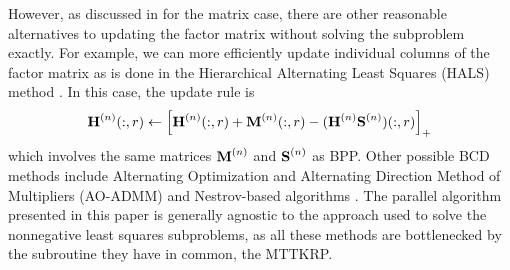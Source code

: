 However, as discussed in \cite{KBP2018} for the matrix case, there are other reasonable alternatives to updating the factor matrix without solving the subproblem exactly.
For example, we can more efficiently update individual columns of the factor matrix as is done in the Hierarchical Alternating Least Squares (HALS) method \cite{CP2009}.
In this case, the update rule is 
$$\Mn{H}{n}(:,r) \leftarrow \lt[ \Mn{H}{n}(:,r) + \Mn{M}{n}(:,r) - (\Mn{H}{n} \Mn{S}{n})(:,r)  \rt]_+$$
which involves the same matrices $\Mn{M}{n}$ and $\Mn{S}{n}$ as BPP.
Other possible BCD methods include Alternating Optimization and Alternating Direction Method of Multipliers (AO-ADMM) \cite{HSL2015, SBK2017} and Nestrov-based algorithms \cite{LKLHS2017}.
The parallel algorithm presented in this paper is generally agnostic to the approach used to solve the nonnegative least squares subproblems, as all these methods are bottlenecked by the subroutine they have in common, the MTTKRP. 


